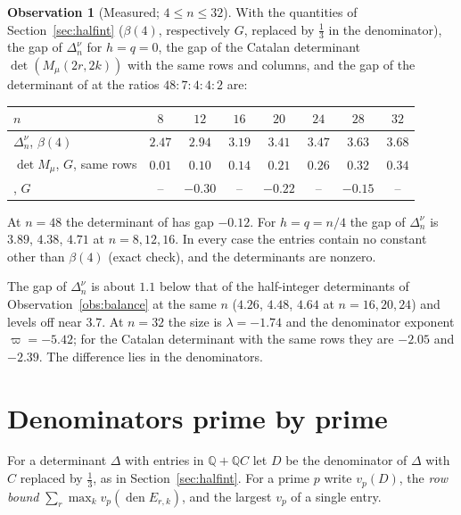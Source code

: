 \documentclass[11pt]{article}
\theoremstyle{definition}
\newtheorem{observation}[theorem]{Observation}
\begin{document}
\begin{observation}[Measured; $4\le n\le32$]\label{obs:nubalance}
With the quantities of Section~\ref{sec:halfint} ($\beta(4)$, respectively $G$, replaced by $\frac13$ in the denominator), the gap of $\Delta^\nu_n$ for $h=q=0$, the gap of the Catalan determinant $\det(M_\mu(2r,2k))$ with the same rows and columns, and the gap of the determinant of \cite{OAI} at the ratios $48:7:4:4:2$ are:
\begin{center}
\small
\begin{tabular}{lccccccc}
\toprule
$n$ & $8$ & $12$ & $16$ & $20$ & $24$ & $28$ & $32$\\
\midrule
$\Delta^\nu_n$, $\beta(4)$ & $2.47$ & $2.94$ & $3.19$ & $3.41$ & $3.47$ & $3.63$ & $3.68$\\
$\det M_\mu$, $G$, same rows & $0.01$ & $0.10$ & $0.14$ & $0.21$ & $0.26$ & $0.32$ & $0.34$\\
\cite{OAI}, $G$ & -- & $-0.30$ & -- & $-0.22$ & -- & $-0.15$ & --\\
\bottomrule
\end{tabular}
\end{center}
At $n=48$ the determinant of \cite{OAI} has gap $-0.12$. For $h=q=n/4$ the gap of $\Delta^\nu_n$ is $3.89$, $4.38$, $4.71$ at $n=8,12,16$. In every case the entries contain no constant other than $\beta(4)$ (exact check), and the determinants are nonzero.
\end{observation}

The gap of $\Delta^\nu_n$ is about $1.1$ below that of the half-integer determinants of Observation~\ref{obs:balance} at the same $n$ ($4.26$, $4.48$, $4.64$ at $n=16,20,24$) and levels off near $3.7$. At $n=32$ the size is $\lambda=-1.74$ and the denominator exponent $\varpi=-5.42$; for the Catalan determinant with the same rows they are $-2.05$ and $-2.39$. The difference lies in the denominators.

\section{Denominators prime by prime}\label{sec:primes}

For a determinant $\Delta$ with entries in $\mathbb Q+\mathbb QC$ let $D$ be the denominator of $\Delta$ with $C$ replaced by $\frac13$, as in Section~\ref{sec:halfint}. For a prime $p$ write $v_p(D)$, the \emph{row bound} $\sum_r\max_kv_p(\operatorname{den}E_{r,k})$, and the largest $v_p$ of a single entry.
\end{document}
